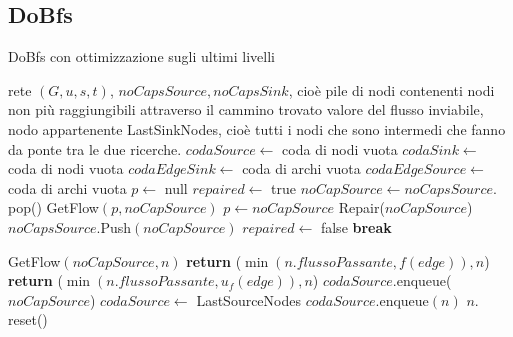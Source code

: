 \documentclass{article}
\begin{document}
\subsection{DoBfs}
\begin{algorithm}
    \caption{DoBfs con ottimizzazione sugli ultimi livelli}
    \begin{algorithmic}[1]
        \REQUIRE rete $(G,u,s,t)$, $noCapsSource, noCapsSink$, cioè pile di nodi contenenti nodi non più raggiungibili attraverso il cammino trovato
        \ENSURE valore del flusso inviabile, nodo appartenente LastSinkNodes, cioè tutti i nodi che sono intermedi che fanno da ponte tra le due ricerche.
        \STATE $codaSource \leftarrow$ coda di nodi vuota
        \STATE $codaSink \leftarrow$ coda di nodi vuota
        \STATE $codaEdgeSink \leftarrow$ coda di archi vuota
        \STATE $codaEdgeSource \leftarrow$ coda di archi vuota
        \STATE $p \leftarrow $ null
        \STATE $repaired \leftarrow $ true
        \STATE $noCapSource \leftarrow noCapsSource.$pop()
        \STATE GetFlow$(p,noCapSource)$
        \STATE $p \leftarrow noCapSource$
        \STATE Repair($noCapSource$)
        \STATE $noCapsSource.$Push$(noCapSource)$
        \STATE $repaired \leftarrow$ false
        \STATE \textbf{break}
        \ENDIF
        \ENDWHILE
    \end{algorithmic}
\end{algorithm}
\newpage
\begin{algorithm}
    \begin{algorithmic}
        \STATE GetFlow$(noCapSource,n)$ 
        \STATE \textbf{return} ($\min(n.flussoPassante,f(edge)),n$)
        \ELSE
        \STATE \textbf{return} ($\min(n.flussoPassante,u_f(edge)),n$)
        \ENDIF
        \ENDIF
        \ENDFOR
        \ENDIF
        \STATE $codaSource.$enqueue($noCapSource$)
        \STATE $codaSource \leftarrow$ LastSourceNodes 
        \ELSE
        \STATE $codaSource.$enqueue$(n) $
        \ENDFOR
        \STATE $n.$reset()
        \ENDFOR
        \ENDIF
        \ENDIF
        \ENDIF

    \end{algorithmic}
\end{algorithm}
\end{document}
